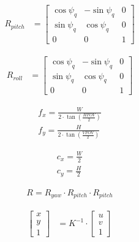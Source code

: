 \documentclass[12pt]{article}       %
\begin{document}
\begin{align}
    R_{pitch} &=
    \begin{bmatrix}
        \cos\psi_{q}   & -\sin\psi_{q}  & 0 \\
        \sin\psi_{q}   & \cos\psi_{q}   & 0 \\
        0              & 0              & 1
    \end{bmatrix} 
    \label{eq:rpitch}
\end{align}

\begin{align}
    R_{roll} &=
    \begin{bmatrix}
        \cos\psi_{q}   & -\sin\psi_{q}  & 0 \\
        \sin\psi_{q}   & \cos\psi_{q}   & 0 \\
        0              & 0              & 1
    \end{bmatrix} 
    \label{eq:rroll}
\end{align}

\begin{align}
    f_{x}=\frac{W}{2\cdot\tan\left(\frac{HFOV}{2}\right)}
    \label{eq:fx}
    \\
    f_{y}=\frac{H}{2\cdot\tan\left(\frac{VFOV}{2}\right)}
    \label{eq:fy}
\end{align}


\begin{align}
    c_{x}=\frac{W}{2}
    \label{eq:cx}
    \\
    c_{y}=\frac{H}{2}
    \label{eq:cy}
\end{align}



\begin{align}
    R=R_{yaw}\cdot R_{pitch} \cdot R_{pitch}
    \label{eq:R}
\end{align}


\begin{align}
    \begin{bmatrix}
        x       \\
        y    \\
        1        
    \end{bmatrix} 
     &=K^{-1}\cdot
     \begin{bmatrix}
        u       \\
        v       \\
        1        
    \end{bmatrix} 
    \label{eq:xy1}
\end{align}
\end{document}
